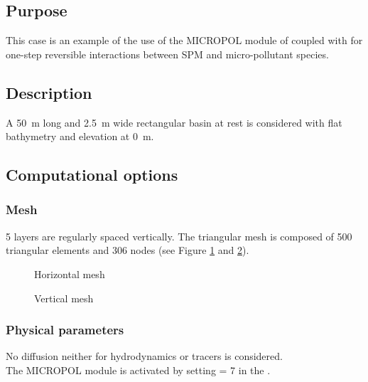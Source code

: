 \subsection{Purpose}

This case is an example of the use of the MICROPOL module of \waqtel
coupled with  for one-step reversible interactions between SPM and
micro-pollutant species.

\subsection{Description}

A 50~m long and 2.5~m wide rectangular basin at rest is considered
with flat bathymetry and elevation at 0~m.

\subsection{Computational options}

\subsubsection{Mesh}

5 layers are regularly spaced vertically.
The triangular mesh is composed of 500 triangular elements and
306 nodes (see Figure \ref{fig:waq3d_micropol:mesh_pol} and \ref{fig:waq3d_micropol:mesh_pol_sec}).

\begin{figure}[H]
 \centering
\caption{Horizontal mesh}
 \label{fig:waq3d_micropol:mesh_pol}
\end{figure}

\begin{figure}[H]
 \centering
\caption{Vertical mesh}
 \label{fig:waq3d_micropol:mesh_pol_sec}
\end{figure}

\subsubsection{Physical parameters}
No diffusion neither for hydrodynamics or tracers is considered.\\
The MICROPOL module is activated by setting  = 7
in the  .\\

